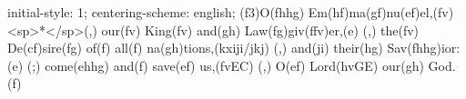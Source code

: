 initial-style: 1;
centering-scheme: english;
(f3)O(fhhg) Em(hf)ma(gf)nu(ef)el,(fv) <sp>*</sp>(,) our(fv) King(fv) and(gh) Law(fg)giv(ffv)er,(e) (,) the(fv) De(cf)sire(fg) of(f) all(f) na(gh)tions,(kxiji/jkj) (,) and(ji) their(hg) Sav(fhhg)ior:(e) (;) come(ehhg) and(f) save(ef) us,(fvEC) (,) O(ef) Lord(hvGE) our(gh) God.(f)
